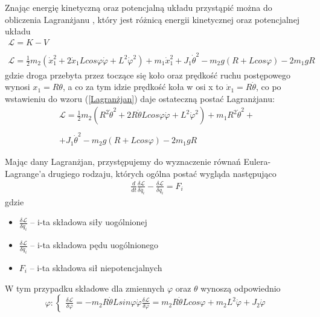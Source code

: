 Znając energię kinetyczną oraz potencjalną układu przystąpić można do obliczenia Lagranżjanu \cite{ManipulatoryiRoboty}, który jest różnicą energii kinetycznej oraz potencjalnej układu
\begin{equation}
    \begin{array}{cl}
    \mathcal{L} = K - V \\ \\ 
    \mathcal{L} = \frac{1}{2}m_2(\dot{x}_1^2 + 2\dot{x}_1Lcos\varphi\dot{\varphi} + L^2\dot{\varphi}^2) + m_1\dot{x}_1^2 + J_1\dot{\theta}^2 - m_2g(R + Lcos\varphi) - 2m_1gR
    \label{Lagranżjan}
    \end{array}
\end{equation}
gdzie droga przebyta przez toczące się koło oraz prędkość ruchu postępowego wynosi $x_1 = R\theta$, a co za tym idzie prędkość koła w osi x to $\dot{x}_1 = R\dot{\theta}$, co po wstawieniu do wzoru (\ref{Lagranżjan}) daje ostateczną postać Lagranżjanu:
\begin{equation}
    \begin{array}{ll}
    \mathcal{L} = \frac{1}{2}m_2(R^2\dot{\theta}^2 + 2R\dot{\theta}Lcos\varphi\dot{\varphi} + L^2\dot{\varphi}^2) + m_1R^2\dot{\theta}^2 + \\ \\
    + J_1\dot{\theta}^2 - m_2g(R + Lcos\varphi) - 2m_1gR
    \end{array}
\end{equation}

Mając dany Lagranżjan, przystępujemy do wyznaczenie równań Eulera-Lagrange'a drugiego rodzaju, których ogólna postać wygląda następująco
$$
    \begin{array}{ll}
    \frac{d}{dt}\frac{\delta\mathcal{L}}{\delta\dot{q_i}} - \frac{\delta\mathcal{L}}{\delta q_i} = F_i
    \end{array}
$$
gdzie
\begin{itemize}
    \item $\frac{\delta\mathcal{L}}{\delta q_i}$ -- i-ta składowa siły uogólnionej
    \item $\frac{\delta\mathcal{L}}{\delta\dot{q_i}}$ -- i-ta składowa pędu uogólnionego
    \item $F_i$ -- i-ta składowa sił niepotencjalnych
\end{itemize}

W tym przypadku składowe dla zmiennych $\varphi$ oraz $\theta$ wynoszą odpowiednio
$$
    \varphi:
    \left\{
    \begin{array}{ll}
    \frac{\delta\mathcal{L}}{\delta\varphi} = -m_2R\dot{\theta}Lsin\varphi\dot{\varphi}
    \frac{\delta\mathcal{L}}{\delta\dot{\varphi}} = m_2R\dot{\theta}Lcos\varphi + m_2L^2\dot{\varphi} + J_2\dot{\varphi}
    \end{array}
    \right.
$$

